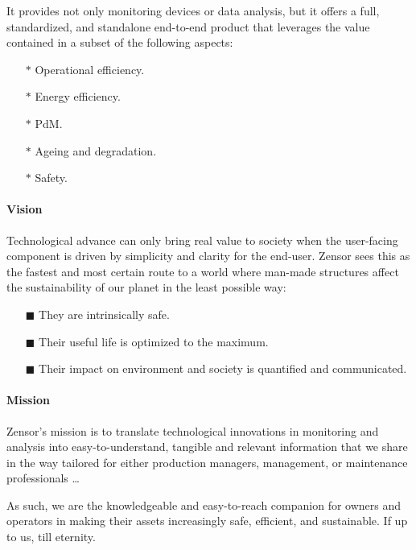 It provides not only monitoring devices or data analysis, but it offers a full, standardized, and standalone end-to-end product that leverages the value contained in a subset of the following aspects:
\begin{multicols}{2}
    \begin{itemize}
        \item[$\ast$] Operational efficiency.
        \item[$\ast$] Energy efficiency.
        \item[$\ast$] \acl{PdM}.
        \item[$\ast$] Ageing and degradation.
        \item[$\ast$] Safety.
    \end{itemize}
\end{multicols}

\paragraph{Vision} 
Technological advance can only bring real value to society when the user-facing component is driven by simplicity and clarity for the end-user. 
Zensor sees this as the fastest and most certain route to a world where man-made structures affect the sustainability of our planet in the least possible way:
\begin{enumerate}
    \item[$\blacksquare$] They are intrinsically safe.
    \item[$\blacksquare$] Their useful life is optimized to the maximum.
    \item[$\blacksquare$] Their impact on environment and society is quantified and communicated.
\end{enumerate}

\paragraph{Mission}
Zensor's mission is to translate technological innovations in monitoring and analysis into easy-to-understand, tangible and relevant information that we share in the way tailored for either production managers,
management, or maintenance professionals \dots \par
As such, we are the knowledgeable and easy-to-reach companion for owners and operators in making their assets increasingly safe, efficient, and sustainable. If up to us, till eternity.
